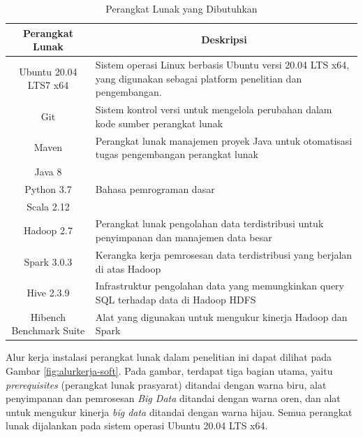\begin{table}[h!]
	\centering
	\caption{Perangkat Lunak yang Dibutuhkan}
		\begin{tabular}{|c|p{9cm}|}
		\hline
			\textbf{Perangkat Lunak} & \multicolumn{1}{c|}{\textbf{Deskripsi}}                                                                                \\ \hline
			Ubuntu 20.04 LTS7 x64     & Sistem operasi Linux berbasis Ubuntu versi 20.04 LTS x64, yang digunakan sebagai platform penelitian dan pengembangan. \\ \hline
			Git                      & Sistem kontrol versi untuk mengelola perubahan dalam kode sumber perangkat lunak                                       \\ \hline
			Maven                    & Perangkat lunak manajemen proyek Java untuk otomatisasi tugas pengembangan perangkat lunak                             \\ \hline
			Java 8                   & \multirow{3}{*}{Bahasa pemrograman dasar}                                 \\ \cline{1-1}
			Python 3.7               &                                                                                                                        \\ \cline{1-1}
			Scala 2.12               &                                                                                                                        \\ \hline
			Hadoop 2.7               & Perangkat lunak pengolahan data terdistribusi untuk penyimpanan dan manajemen data besar                               \\ \hline
			Spark 3.0.3              & Kerangka kerja pemrosesan data terdistribusi yang berjalan di atas Hadoop                                              \\ \hline
			Hive 2.3.9               & Infrastruktur pengolahan data yang memungkinkan query SQL terhadap data di Hadoop HDFS                                 \\ \hline
			Hibench Benchmark Suite  & Alat yang digunakan untuk mengukur kinerja Hadoop dan Spark                                                            \\ \hline
		\end{tabular}
	\label{table:software-needs}
\end{table}

Alur kerja instalasi perangkat lunak dalam penelitian ini dapat dilihat pada Gambar \ref{fig:alurkerja-soft}. Pada gambar, terdapat tiga bagian utama, yaitu \textit{prerequisites} (perangkat lunak prasyarat) ditandai dengan warna biru, alat penyimpanan dan pemrosesan \textit{Big Data} ditandai dengan warna oren, dan alat untuk mengukur kinerja \textit{big data} ditandai dengan warna hijau. Semua perangkat lunak dijalankan pada sistem operasi Ubuntu 20.04 LTS x64.

